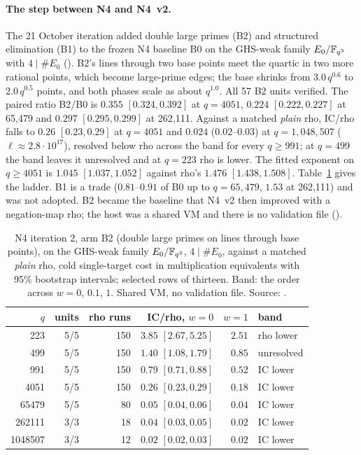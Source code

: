 \paragraph{The step between N4 and N4~v2.} The 21 October iteration added
double large primes (B2) and structured elimination (B1) to the frozen N4
baseline B0 on the GHS-weak family $E_0/\mathbb{F}_{q^3}$ with $4\mid\#E_0$
(). B2's lines through two
base points meet the quartic in two more rational points, which become
large-prime edges; the base shrinks from $3.0\,q^{0.6}$ to $2.0\,q^{0.5}$
points, and both phases scale as about $q^{1.0}$. All 57 B2 units verified.
The paired ratio B2/B0 is $0.355$ $[0.324,0.392]$ at $q=4051$, $0.224$
$[0.222,0.227]$ at 65{,}479 and $0.297$ $[0.295,0.299]$ at 262{,}111. Against a
matched \emph{plain} rho, IC/rho falls to $0.26$ $[0.23,0.29]$ at $q=4051$
and $0.024$ ($0.02$--$0.03$) at $q=1{,}048{,}507$ ($\ell\approx2.8\cdot10^{17}$),
resolved below rho across the band for every $q\ge991$; at $q=499$ the band
leaves it unresolved and at $q=223$ rho is lower. The fitted exponent on
$q\ge4051$ is $1.045$ $[1.037,1.052]$ against rho's $1.476$ $[1.438,1.508]$.
Table~\ref{tab:jac-n4la} gives the ladder. B1 is a trade ($0.81$--$0.91$ of B0 up to $q=65{,}479$, $1.53$ at 262{,}111) and
was not adopted. B2 became the baseline that N4~v2 then improved with a
negation-map rho; the host was a shared VM and there is no validation file
().

\begin{table}[t]
\centering\small
\begin{tabular}{@{}rrrrrl@{}}
\toprule
$q$ & units & rho runs & IC/rho, $w=0$ & $w=1$ & band \\
\midrule
223 & 5/5 & 150 & $3.85$ $[2.67,5.25]$ & $2.51$ & rho lower \\
499 & 5/5 & 150 & $1.40$ $[1.08,1.79]$ & $0.85$ & unresolved \\
991 & 5/5 & 150 & $0.79$ $[0.71,0.88]$ & $0.52$ & IC lower \\
4051 & 5/5 & 150 & $0.26$ $[0.23,0.29]$ & $0.18$ & IC lower \\
65479 & 5/5 & 80 & $0.05$ $[0.04,0.06]$ & $0.04$ & IC lower \\
262111 & 3/3 & 18 & $0.04$ $[0.03,0.05]$ & $0.02$ & IC lower \\
1048507 & 3/3 & 12 & $0.02$ $[0.02,0.03]$ & $0.02$ & IC lower \\
\bottomrule
\end{tabular}
\caption[]{N4 iteration 2, arm B2 (double large primes on lines through base
points), on the GHS-weak family $E_0/\mathbb{F}_{q^3}$, $4\mid\#E_0$, against a matched
\emph{plain} rho, cold single-target cost in multiplication equivalents with
95\% bootstrap intervals; selected rows of thirteen. Band: the order across
$w=0$, $0.1$, $1$. Shared VM, no validation file. Source:
.}
\label{tab:jac-n4la}
\end{table}

